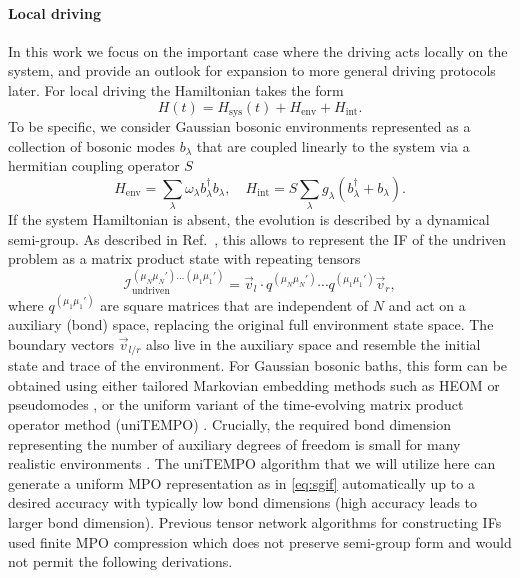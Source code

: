\documentclass[aps,prb, twocolumn,superscriptaddress]{revtex4-2}
\begin{document}
\paragraph*{Local driving}
In this work we focus on the important case where the driving acts locally on the system, and provide an outlook for expansion to more general driving protocols later.
For local driving the Hamiltonian takes the form
\begin{equation}\label{eq:Htot}
    H(t)=H_\mathrm{sys}(t)+H_\mathrm{env}+H_\mathrm{int}.
\end{equation}
To be specific, we consider Gaussian bosonic environments represented as a collection of bosonic modes $b_\lambda$ that are coupled linearly to the system via a hermitian coupling operator $S$
\begin{equation}\label{eq;undriven_if}
    H_\mathrm{env}=\sum_\lambda \omega_\lambda b_\lambda^\dagger b_\lambda,\quad
    H_\mathrm{int}=S\sum_\lambda g_\lambda (b_\lambda^\dagger+ b_\lambda).
\end{equation}
If the system Hamiltonian is absent, the evolution is described by a dynamical semi-group. As described in Ref.~\cite{Link2024May}, this allows to represent the IF of the undriven problem as a matrix product state with repeating tensors
\begin{equation}\label{eq:sgif}
    \mathcal{I}_{\mathrm{undriven}}^{(\mu_N\mu_N')\ldots(\mu_1\mu_1')}= \vec{v}_l\cdot q^{(\mu_N\mu_N')}\cdots q^{(\mu_1\mu_1')}\vec{v}_r,
\end{equation}
where $q^{(\mu_1\mu_1')}$ are square matrices that are independent of $N$ and act on a auxiliary (bond) space, replacing the original full environment state space. The boundary vectors $\vec{v}_{l/r}$ also live in the auxiliary space and resemble the initial state and trace of the environment.
For Gaussian bosonic baths, this form can be obtained using either tailored Markovian embedding methods such as HEOM \cite{Tanimura2020Jul} or pseudomodes \cite{Mascherpa2020May,huang2025Coupled}, or the uniform variant of the time-evolving matrix product operator method (uniTEMPO) \cite{Link2024May}. Crucially, the required bond dimension representing the number of auxiliary degrees of freedom is small for many realistic environments \cite{Vilkoviskiy2024May,thoenniss2024Efficient}. The uniTEMPO algorithm that we will utilize here can generate a uniform MPO representation as in \eqref{eq:sgif} automatically up to a desired accuracy with typically low bond dimensions (high accuracy leads to larger bond dimension). Previous tensor network algorithms for constructing IFs used finite MPO compression \cite{Banuls2009Jun,Strathearn2018Aug,Jorgensen2019Dec,Cygorek2021Jan,Lerose2021May,Ye2021Jul,Sonner2021Dec,Gribben2022Feb,Thoenniss2023May,Chen2024Jan,Frias-Perez2024Mar,Cygorek2024Apr,Cygorek2024May2} which does not preserve semi-group form and would not permit the following derivations.
\end{document}
